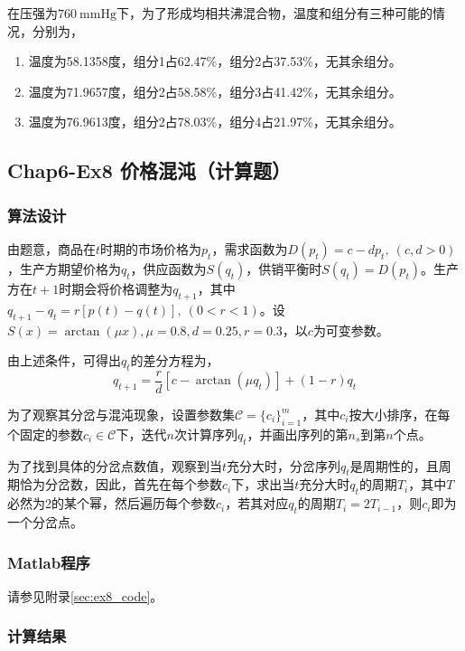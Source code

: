 \documentclass[12pt,a4paper]{article}
\begin{document}
在压强为$760\ \mathrm{mmHg}$下，为了形成均相共沸混合物，温度和组分有三种可能的情况，分别为，
\begin{enumerate}
    \item 温度为58.1358度，组分1占62.47\%，组分2占37.53\%，无其余组分。
    \item 温度为71.9657度，组分2占58.58\%，组分3占41.42\%，无其余组分。
    \item 温度为76.9613度，组分2占78.03\%，组分4占21.97\%，无其余组分。
\end{enumerate}

\subsection{Chap6-Ex8 价格混沌（计算题）}

\subsubsection{算法设计}

由题意，商品在$t$时期的市场价格为$p_t$，需求函数为$D(p_t) = c-d p_t,\ (c,d>0)$，生产方期望价格为$q_t$，供应函数为$S(q_t)$，供销平衡时$S(q_t) = D(p_t)$。生产方在$t+1$时期会将价格调整为$q_{t+1}$，其中$q_{t+1}-q_t=r[p(t)-q(t)],\ (0<r<1)$。设$S(x) = \arctan(\mu x), \mu = 0.8, d = 0.25, r = 0.3$，以$c$为可变参数。

由上述条件，可得出$q_t$的差分方程为，
\begin{equation}\label{eq:ex8_model}
    q_{t+1} = \frac{r}{d}\left[c - \arctan(\mu q_t)\right] + (1-r)q_t
\end{equation}

为了观察其分岔与混沌现象，设置参数集$\mathcal{C}=\{c_i\}_{i=1}^{m}$，其中$c_i$按大小排序，在每个固定的参数$c_i\in\mathcal{C}$下，迭代$n$次计算序列$q_t$，并画出序列的第$n_s$到第$n$个点。

为了找到具体的分岔点数值，观察到当$t$充分大时，分岔序列$q_t$是周期性的，且周期恰为分岔数，因此，首先在每个参数$c_i$下，求出当$t$充分大时$q_t$的周期$T_i$，其中$T$必然为2的某个幂，然后遍历每个参数$c_i$，若其对应$q_t$的周期$T_i=2T_{i-1}$，则$c_i$即为一个分岔点。

\subsubsection{Matlab程序}

请参见附录\ref{sec:ex8_code}。

\subsubsection{计算结果}
\end{document}

